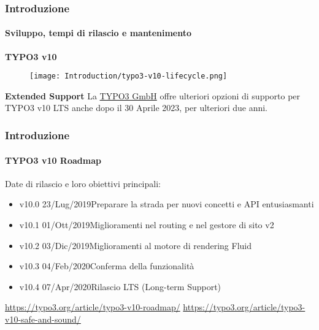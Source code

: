 
\begin{frame}[fragile]
	\frametitle{Introduzione}
	\framesubtitle{Sviluppo, tempi di rilascio e mantenimento}

	\textbf{TYPO3 v10}

	\begin{figure}
		\texttt{[image: Introduction/typo3-v10-lifecycle.png]}
	\end{figure}

	\textbf{Extended Support}\newline
	\smaller
		La \href{https://typo3.com}{TYPO3 GmbH} offre ulteriori opzioni di supporto
		per TYPO3 v10 LTS anche dopo il 30 Aprile 2023, per ulteriori due anni.
	\normalsize

\end{frame}


\begin{frame}[fragile]
	\frametitle{Introduzione}
	\framesubtitle{TYPO3 v10 Roadmap}

	Date di rilascio e loro obiettivi principali:

	\begin{itemize}

		\item
			\begingroup
				\color{typo3orange}
				v10.0 \tabto{1.1cm}23/Lug/2019\tabto{3.4cm}Preparare la strada per nuovi concetti e API entusiasmanti
			\endgroup
		\item v10.1 \tabto{1.1cm}01/Ott/2019\tabto{3.4cm}Miglioramenti nel routing e nel gestore di sito v2
		\item v10.2 \tabto{1.1cm}03/Dic/2019\tabto{3.4cm}Miglioramenti al motore di rendering Fluid
		\item v10.3 \tabto{1.1cm}04/Feb/2020\tabto{3.4cm}Conferma della funzionalità
		\item v10.4 \tabto{1.1cm}07/Apr/2020\tabto{3.4cm}Rilascio LTS (Long-term Support)

	\end{itemize}

	\smaller
		\url{https://typo3.org/article/typo3-v10-roadmap/}\newline
		\url{https://typo3.org/article/typo3-v10-safe-and-sound/}
	\normalsize

\end{frame}

